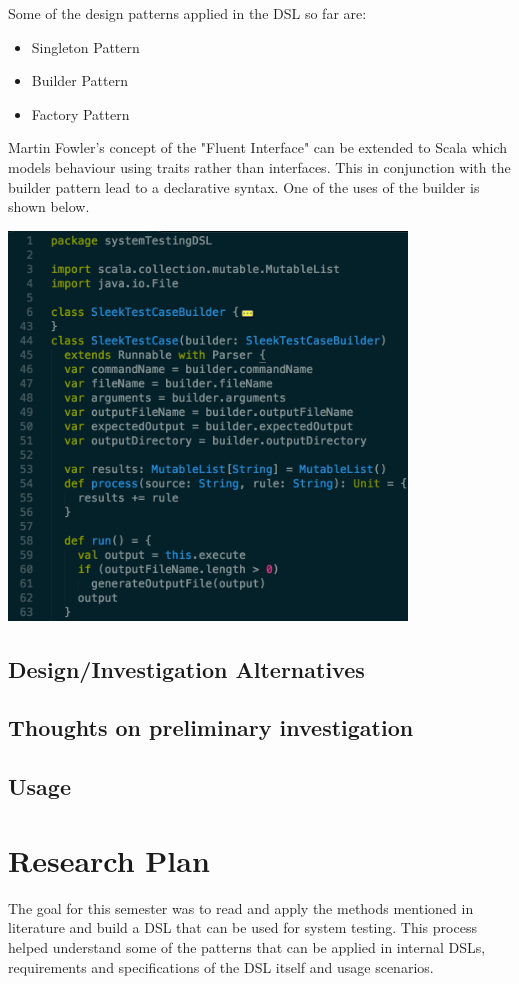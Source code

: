 \documentclass[12 pt]{article}
\begin{document}
Some of the design patterns applied in the DSL so far are:
\begin{itemize}
\item Singleton Pattern
\item Builder Pattern
\item Factory Pattern
\end{itemize}

Martin Fowler's concept of the "Fluent Interface" can be extended to Scala which models behaviour using traits rather than interfaces. This in conjunction with the builder pattern lead to a declarative syntax. One of the uses of the builder is shown below.
\begin{center}
    \includegraphics[width=400px]{figures/builder_pattern.png}
\end{center}
\subsection{Design/Investigation Alternatives}
\subsection{Thoughts on preliminary investigation}
\subsection{Usage}
\newpage
\section{Research Plan}
The goal for this semester was to read and apply the methods mentioned in literature and build a DSL that can be used for system testing. This process helped understand some of the patterns that can be applied in internal DSLs, requirements and specifications of the DSL itself and usage scenarios.
\bigskip
\end{document}
